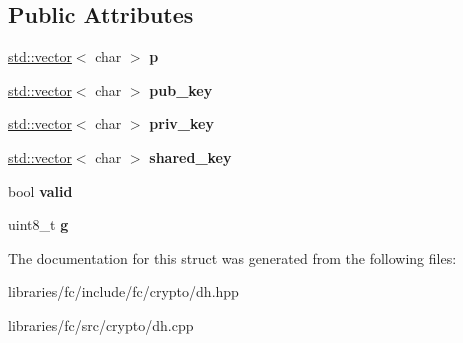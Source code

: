 \subsection*{Public Attributes}
\begin{DoxyCompactItemize}
\item 
\mbox{\label{structfc_1_1diffie__hellman_a4ca2b2be06d99984411f55ca12f28a6a}} 
\mbox{\hyperlink{classstd_1_1vector}{std\+::vector}}$<$ char $>$ {\bfseries p}
\item 
\mbox{\label{structfc_1_1diffie__hellman_acbf40e922a71880db492397abcf1d652}} 
\mbox{\hyperlink{classstd_1_1vector}{std\+::vector}}$<$ char $>$ {\bfseries pub\+\_\+key}
\item 
\mbox{\label{structfc_1_1diffie__hellman_a1313b63b61ccb170d8bd2b7a591c0ec0}} 
\mbox{\hyperlink{classstd_1_1vector}{std\+::vector}}$<$ char $>$ {\bfseries priv\+\_\+key}
\item 
\mbox{\label{structfc_1_1diffie__hellman_a5a8270c545d3269f22598a60a290b27e}} 
\mbox{\hyperlink{classstd_1_1vector}{std\+::vector}}$<$ char $>$ {\bfseries shared\+\_\+key}
\item 
\mbox{\label{structfc_1_1diffie__hellman_aeeff752202a422bd69a5b1b392e47d0c}} 
bool {\bfseries valid}
\item 
\mbox{\label{structfc_1_1diffie__hellman_a54629e9bbb6dc0636a2bcada5b447e7f}} 
uint8\+\_\+t {\bfseries g}
\end{DoxyCompactItemize}


The documentation for this struct was generated from the following files\+:\begin{DoxyCompactItemize}
\item 
libraries/fc/include/fc/crypto/dh.\+hpp\item 
libraries/fc/src/crypto/dh.\+cpp\end{DoxyCompactItemize}
